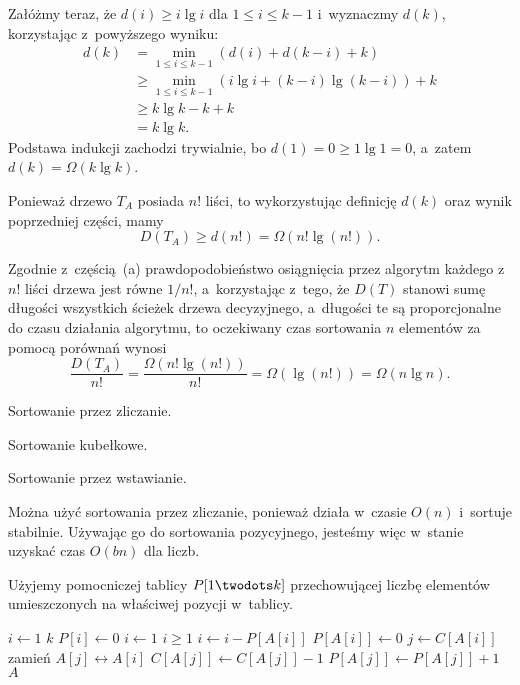 Załóżmy teraz, że $d(i)\ge i\lg i$ dla $1\le i\le k-1$ i~wyznaczmy $d(k)$, korzystając z~powyższego wyniku:
\begin{align*}
	d(k) &= \min_{1\le i\le k-1}(d(i)+d(k-i)+k) \\
	&\ge \min_{1\le i\le k-1}(i\lg i+(k-i)\lg(k-i))+k \\
	&\ge k\lg k-k+k \\
	&= k\lg k.
\end{align*}
Podstawa indukcji zachodzi trywialnie, bo $d(1)=0\ge 1\lg1=0$, a~zatem $d(k)=\Omega(k\lg k)$.

\subproblem %
Ponieważ drzewo $T_A$ posiada $n!$ liści, to wykorzystując definicję $d(k)$ oraz wynik poprzedniej części, mamy
\[
	D(T_A) \ge d(n!) = \Omega(n!\lg(n!)).
\]

Zgodnie z~częścią~(a) prawdopodobieństwo osiągnięcia przez algorytm każdego z~$n!$ liści drzewa jest równe $1/n!$, a~korzystając z~tego, że $D(T)$ stanowi sumę długości wszystkich ścieżek drzewa decyzyjnego, a~długości te są proporcjonalne do czasu działania algorytmu, to oczekiwany czas sortowania $n$ elementów za pomocą porównań wynosi
\[
	\frac{D(T_A)}{n!} = \frac{\Omega(n!\lg(n!))}{n!} = \Omega(\lg(n!)) = \Omega(n\lg n).
\]

\subproblem %


\subproblem %
Sortowanie przez zliczanie.

\subproblem %
Sortowanie kubełkowe.

\subproblem %
Sortowanie przez wstawianie.

\subproblem %
Można użyć sortowania przez zliczanie, ponieważ działa w~czasie $O(n)$ i~sortuje stabilnie. Używając go do sortowania pozycyjnego, jesteśmy więc w~stanie uzyskać czas $O(bn)$ dla  liczb.

\subproblem %
Użyjemy pomocniczej tablicy $P[1\twodots k]$ przechowującej liczbę elementów umieszczonych na właściwej pozycji w~tablicy.
\begin{codebox}
\li	\For $i\gets1$ \To $k$
\li		\Do $P[i]\gets0$
		\End
\li	$i\gets1$
\li	\While $i\ge1$
\li		\Do
			$i\gets i-P[A[i]]$
\li			$P[A[i]]\gets0$
\li			$j\gets C[A[i]]$
\li			zamień $A[j]\leftrightarrow A[i]$
\li			$C[A[j]]\gets C[A[j]]-1$
\li			$P[A[j]]\gets P[A[j]]+1$
		\End
\li	\Return $A$
\end{codebox}

